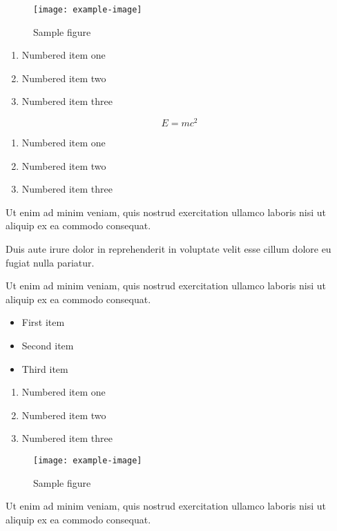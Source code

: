 \documentclass{article}
\begin{document}
\begin{figure}[h]
    \centering
    \texttt{[image: example-image]}
    \caption{Sample figure}
    \label{fig:sample}
\end{figure}

\begin{enumerate}
\item Numbered item one
\item Numbered item two
\item Numbered item three
\end{enumerate}

\begin{equation}
    E = mc^2
\end{equation}


\begin{enumerate}
\item Numbered item one
\item Numbered item two
\item Numbered item three
\end{enumerate}

Ut enim ad minim veniam, quis nostrud exercitation ullamco laboris nisi ut aliquip ex ea commodo consequat.

Duis aute irure dolor in reprehenderit in voluptate velit esse cillum dolore eu fugiat nulla pariatur.


Ut enim ad minim veniam, quis nostrud exercitation ullamco laboris nisi ut aliquip ex ea commodo consequat.

\begin{itemize}
\item First item
\item Second item
\item Third item
\end{itemize}

\begin{enumerate}
\item Numbered item one
\item Numbered item two
\item Numbered item three
\end{enumerate}

\begin{figure}[h]
    \centering
    \texttt{[image: example-image]}
    \caption{Sample figure}
    \label{fig:sample}
\end{figure}

Ut enim ad minim veniam, quis nostrud exercitation ullamco laboris nisi ut aliquip ex ea commodo consequat.
\end{document}
